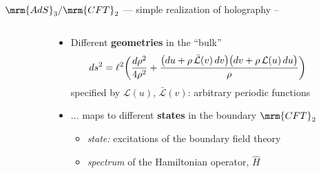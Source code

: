 \documentclass[aspectratio=169,10pt
	,noamsthm
]{beamer}
\begin{document}
\begin{frame}{$\mrm{AdS}_3/\mrm{CFT}_2$ --- simple realization of holography}{%
	\textcite{Banados:1992wn} -- 
}
\begin{columns}
\begin{column}{.4\textwidth}
\figAdsCft
\end{column}
\begin{column}{.6\textwidth}
	\begin{itemize}
	\item Different \textbf{geometries} in the ``bulk''
	\begin{equation}
	\hspace{-2.5em}
		ds^2 = \ell^2 \bigg( \frac{d\rho^2}{4 \rho^2} + \frac{ \big( du + \rho \, \mathcal {\bar L}(v)\, dv \big) \big( dv + \rho \, \mathcal L(u)\, du \big) }{\rho} \bigg)\ \label{banados}
	\end{equation}
	specified by $\mathcal L(u)$, $\bar{\mathcal L}(v)$: arbitrary periodic functions
	
	\vspace{.5\baselineskip}
	
\pause
	\item ... maps to different \textbf{states} in the boundary $\mrm{CFT}_2$
	\begin{itemize}
		\item \textit{state:} excitations of the boundary field theory
		\item \textit{spectrum} of the Hamiltonian operator, $\hat{H}$
	\end{itemize}
	\end{itemize}
\end{column}
\end{columns}
\end{frame}
\end{document}
